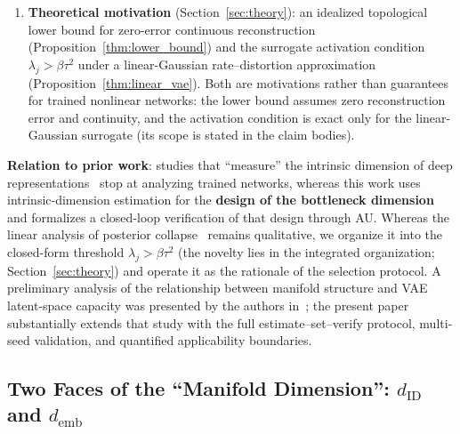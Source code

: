 \documentclass[make,article,submit,pdftex,moreauthors]{Definitions/mdpi}
\newcommand{\dID}{d_{\mathrm{ID}}}
\newcommand{\hatdID}{\hat{d}_{\mathrm{ID}}}
\newcommand{\demb}{d_{\mathrm{emb}}}
\begin{document}
\begin{enumerate}
        values~\cite{pope2021intrinsic} up to $m \approx 2\hatdID$ but
        inflates beyond;
        (c) for Conv-VAEs at $\beta_{\max} = 4$ no substantial truncation
        is observed within $m \leq 512$---consistent, under the surrogate
        interpretation, with an effective truncation threshold beyond the
        tested range---so AU verification requires a strengthened
        $\beta$ (the $\beta$-strengthened recovery achieves V1 only, not
        V2; 3 seeds), and Step 3 on natural images remains unresolved---the
        contributions are claimed inclusive of these limitations.
  \item \textbf{Theoretical motivation} (Section~\ref{sec:theory}):
        an idealized topological lower bound for zero-error continuous
        reconstruction (Proposition~\ref{thm:lower_bound}) and the
        surrogate activation condition $\lambda_j > \beta\tau^2$ under a
        linear-Gaussian rate--distortion approximation
        (Proposition~\ref{thm:linear_vae}).
        Both are motivations rather than guarantees for trained nonlinear
        networks: the lower bound assumes zero reconstruction error and
        continuity, and the activation condition is exact only for the
        linear-Gaussian surrogate (its scope is stated in the claim
        bodies).
\end{enumerate}

\textbf{Relation to prior work}:
studies that ``measure'' the intrinsic dimension of deep
representations~\cite{ansuini2019intrinsic,pope2021intrinsic,valeriani2023geometry}
stop at analyzing trained networks, whereas this work uses
intrinsic-dimension estimation for the \textbf{design of the bottleneck
dimension} and formalizes a closed-loop verification of that design through
AU.
Whereas the linear analysis of posterior collapse~\cite{lucas2019elbo}
remains qualitative, we organize it into the closed-form threshold
$\lambda_j > \beta\tau^2$ (the novelty lies in the integrated organization;
Section~\ref{sec:theory}) and operate it as the rationale of the selection
protocol.
A preliminary analysis of the relationship between manifold structure and
VAE latent-space capacity was presented by the authors
in~\cite{obata2025manifold}; the present paper substantially extends that
study with the full estimate--set--verify protocol, multi-seed validation,
and quantified applicability boundaries.

\subsection{Two Faces of the ``Manifold Dimension'': $\dID$ and $\demb$}\label{sec:intro_dim}
\end{document}
